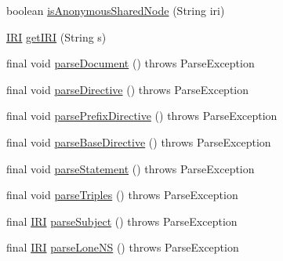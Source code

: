 \begin{DoxyCompactItemize}
\item 
boolean \hyperlink{classuk_1_1ac_1_1manchester_1_1cs_1_1owl_1_1owlapi_1_1turtle_1_1parser_1_1_turtle_parser_a06af96921297fe5a5732763f3ed56bcc}{is\-Anonymous\-Shared\-Node} (String iri)
\item 
\hyperlink{classorg_1_1semanticweb_1_1owlapi_1_1model_1_1_i_r_i}{I\-R\-I} \hyperlink{classuk_1_1ac_1_1manchester_1_1cs_1_1owl_1_1owlapi_1_1turtle_1_1parser_1_1_turtle_parser_a5f64eaf17030b8be775a25f743914d0e}{get\-I\-R\-I} (String s)
\item 
final void \hyperlink{classuk_1_1ac_1_1manchester_1_1cs_1_1owl_1_1owlapi_1_1turtle_1_1parser_1_1_turtle_parser_a47fb089dbd98cf2c415c97bcd3375044}{parse\-Document} ()  throws Parse\-Exception 
\item 
final void \hyperlink{classuk_1_1ac_1_1manchester_1_1cs_1_1owl_1_1owlapi_1_1turtle_1_1parser_1_1_turtle_parser_a85f00c7e89048ff60844917e42aa303f}{parse\-Directive} ()  throws Parse\-Exception 
\item 
final void \hyperlink{classuk_1_1ac_1_1manchester_1_1cs_1_1owl_1_1owlapi_1_1turtle_1_1parser_1_1_turtle_parser_acfc3b161054320724a786783e30dd3f6}{parse\-Prefix\-Directive} ()  throws Parse\-Exception 
\item 
final void \hyperlink{classuk_1_1ac_1_1manchester_1_1cs_1_1owl_1_1owlapi_1_1turtle_1_1parser_1_1_turtle_parser_af867b9cfc9ce79083b501cd53a2707c3}{parse\-Base\-Directive} ()  throws Parse\-Exception 
\item 
final void \hyperlink{classuk_1_1ac_1_1manchester_1_1cs_1_1owl_1_1owlapi_1_1turtle_1_1parser_1_1_turtle_parser_a7fe911639c0efb2a6ab6e886bbb1eb3a}{parse\-Statement} ()  throws Parse\-Exception 
\item 
final void \hyperlink{classuk_1_1ac_1_1manchester_1_1cs_1_1owl_1_1owlapi_1_1turtle_1_1parser_1_1_turtle_parser_a6e48ef8408259365e149d393bb4a6cd2}{parse\-Triples} ()  throws Parse\-Exception 
\item 
final \hyperlink{classorg_1_1semanticweb_1_1owlapi_1_1model_1_1_i_r_i}{I\-R\-I} \hyperlink{classuk_1_1ac_1_1manchester_1_1cs_1_1owl_1_1owlapi_1_1turtle_1_1parser_1_1_turtle_parser_aa8f9d54450c1b905430e8784b18fc7bc}{parse\-Subject} ()  throws Parse\-Exception 
\item 
final \hyperlink{classorg_1_1semanticweb_1_1owlapi_1_1model_1_1_i_r_i}{I\-R\-I} \hyperlink{classuk_1_1ac_1_1manchester_1_1cs_1_1owl_1_1owlapi_1_1turtle_1_1parser_1_1_turtle_parser_a63262b50935bd4b97b8ce899a3194471}{parse\-Lone\-N\-S} ()  throws Parse\-Exception 
\item 

\end{DoxyCompactItemize}

